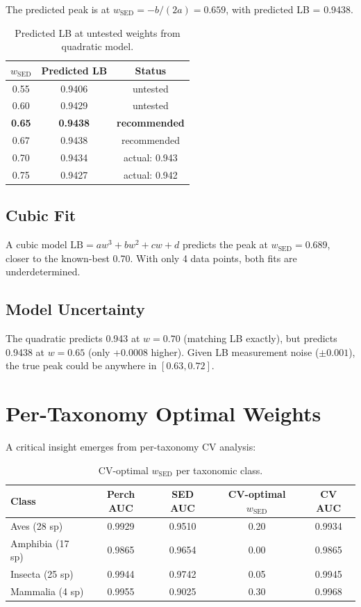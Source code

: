 \documentclass[a4paper,11pt]{article}
\begin{document}
The predicted peak is at $w_\text{SED} = -b/(2a) = 0.659$, with predicted LB = 0.9438.

\begin{table}[h]
\centering
\caption{Predicted LB at untested weights from quadratic model.}
\begin{tabular}{ccc}
\toprule
$w_\text{SED}$ & Predicted LB & Status \\
\midrule
0.55 & 0.9406 & untested \\
0.60 & 0.9429 & untested \\
\textbf{0.65} & \textbf{0.9438} & \textbf{recommended} \\
0.67 & 0.9438 & recommended \\
0.70 & 0.9434 & actual: 0.943 \\
0.75 & 0.9427 & actual: 0.942 \\
\bottomrule
\end{tabular}
\label{tab:predicted}
\end{table}

\subsection{Cubic Fit}

A cubic model $\text{LB} = aw^3 + bw^2 + cw + d$ predicts the peak at $w_\text{SED} = 0.689$, closer to the known-best 0.70.
With only 4 data points, both fits are underdetermined.

\subsection{Model Uncertainty}

The quadratic predicts 0.943 at $w=0.70$ (matching LB exactly), but predicts 0.9438 at $w=0.65$ (only +0.0008 higher).
Given LB measurement noise ($\pm 0.001$), the true peak could be anywhere in $[0.63, 0.72]$.

\section{Per-Taxonomy Optimal Weights}

A critical insight emerges from per-taxonomy CV analysis:

\begin{table}[h]
\centering
\caption{CV-optimal $w_\text{SED}$ per taxonomic class.}
\begin{tabular}{lcccc}
\toprule
Class & Perch AUC & SED AUC & CV-optimal $w_\text{SED}$ & CV AUC \\
\midrule
Aves (28 sp) & 0.9929 & 0.9510 & 0.20 & 0.9934 \\
Amphibia (17 sp) & 0.9865 & 0.9654 & 0.00 & 0.9865 \\
Insecta (25 sp) & 0.9944 & 0.9742 & 0.05 & 0.9945 \\
Mammalia (4 sp) & 0.9955 & 0.9025 & 0.30 & 0.9968 \\
\bottomrule
\end{tabular}
\label{tab:pertax}
\end{table}
\end{document}
